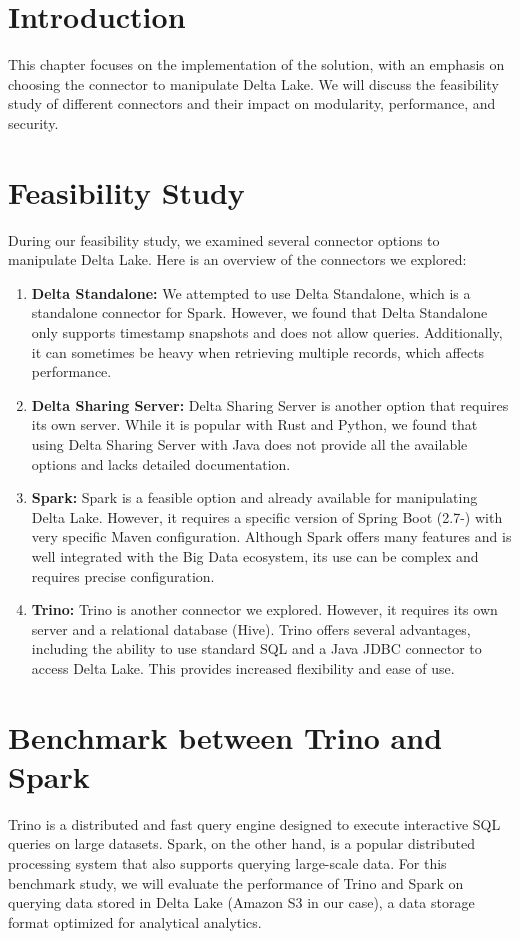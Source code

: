 
\section*{Introduction}

This chapter focuses on the implementation of the solution, with an emphasis on choosing the connector to manipulate Delta Lake. We will discuss the feasibility study of different connectors and their impact on modularity, performance, and security.

\section{Feasibility Study}
During our feasibility study, we examined several connector options to manipulate Delta Lake. Here is an overview of the connectors we explored:

\begin{enumerate}
\item \textbf{Delta Standalone:} We attempted to use Delta Standalone, which is a standalone connector for Spark. However, we found that Delta Standalone only supports timestamp snapshots and does not allow queries. Additionally, it can sometimes be heavy when retrieving multiple records, which affects performance.
\item \textbf{Delta Sharing Server:} Delta Sharing Server is another option that requires its own server. While it is popular with Rust and Python, we found that using Delta Sharing Server with Java does not provide all the available options and lacks detailed documentation.
\item \textbf{Spark:} Spark is a feasible option and already available for manipulating Delta Lake. However, it requires a specific version of Spring Boot (2.7-) with very specific Maven configuration. Although Spark offers many features and is well integrated with the Big Data ecosystem, its use can be complex and requires precise configuration.
\item \textbf{Trino:} Trino is another connector we explored. However, it requires its own server and a relational database (Hive). Trino offers several advantages, including the ability to use standard SQL and a Java JDBC connector to access Delta Lake. This provides increased flexibility and ease of use.
\end{enumerate}

\section{Benchmark between Trino and Spark}
Trino is a distributed and fast query engine designed to execute interactive SQL queries on large datasets. Spark, on the other hand, is a popular distributed processing system that also supports querying large-scale data.
For this benchmark study, we will evaluate the performance of Trino and Spark on querying data stored in Delta Lake (Amazon S3 in our case), a data storage format optimized for analytical analytics.

